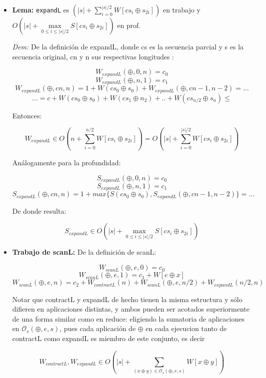 \documentclass[12pt]{article}
\begin{document}
\begin{itemize}

\item \textbf{Lema:} \texttt{expandL} es $(|s| + \sum\limits_{i=0}^{|s|/2} W[cs_{i} \oplus s_{2i}])$ en trabajo y $O(|s| + \max\limits_{0 \leq i \leq |s|/2} S[cs_{i} \oplus s_{2i}])$ en prof.

 \textit{Dem:} De la definición de expandL, donde cs es la secuencia parcial y s es la secuencia original, cn y n sus respectivas longitudes :
    
    $$ W_{expandL}(\oplus, 0, n) = c_0 $$
    $$ W_{expandL}(\oplus, n, 1) = c_1 $$
    $$ W_{expandL}(\oplus, cn, n) = 1 + W(cs_0 \oplus s_0) + W_{expandL}(\oplus, cn-1, n-2) = ... $$
    $$ ... = c + W(cs_0 \oplus s_0) + W(cs_1 \oplus n_2) + .. + W(cs_{n/2} \oplus s_n) \leq $$

    Entonces:
    
    $$ W_{expandL} \in O(n + \sum\limits_{i=0}^{n/2} W[cs_{i} \oplus s_{2i}]) = O(|s| + \sum\limits_{i=0}^{|s|/2} W[cs_{i} \oplus s_{2i}]) $$
    
    Análogamente para la profundidad:
    
    $$ S_{expandL}(\oplus, 0, n) = c_0 $$
    $$ S_{expandL}(\oplus, n, 1) = c_1 $$
    $$ S_{expandL}(\oplus, cn, n) = 1 + max\{ S(cs_0 \oplus s_0), S_{expandL}(\oplus, cn-1, n-2)\} = ... $$
    
    De donde resulta:
    
    $$ S_{expandL} \in O(|s| + \max\limits_{0 \leq i \leq |s|/2} S[cs_{i} \oplus s_{2i}]) $$

\item \textbf{Trabajo de scanL:}
    De la definición de scanL:
    
    $$ W_{scanL}(\oplus, e, 0) = c_0 $$
    $$ W_{scanL}(\oplus, e, 1) = c_1 + W[e \oplus x]  $$
    $$ W_{scanL}(\oplus, e, n) = c_2 + W_{contractL}(n) + W_{scanL}(\oplus, e, n/2) + W_{expandL}(n/2, n) $$
    
    Notar que contractL y expandL de hecho tienen la misma estructura y sólo difieren en aplicaciones distintas, y ambos pueden ser acotados superiormente de una forma similar como en reduce: eligiendo la sumatoria de aplicaciones en $\mathcal{O}_s(\oplus,e,s)$, pues cada aplicación de $\oplus$ en cada ejecucion tanto de contractL como expandL es miembro de este conjunto, es decir
    
    $$ W_{contractL}, W_{expandL} \in O(|s| + \sum\limits_{(x\oplus y)\in\mathcal{O}_s(\oplus,e,s)} W[x\oplus y]) $$
    

\end{itemize}
\end{document}
